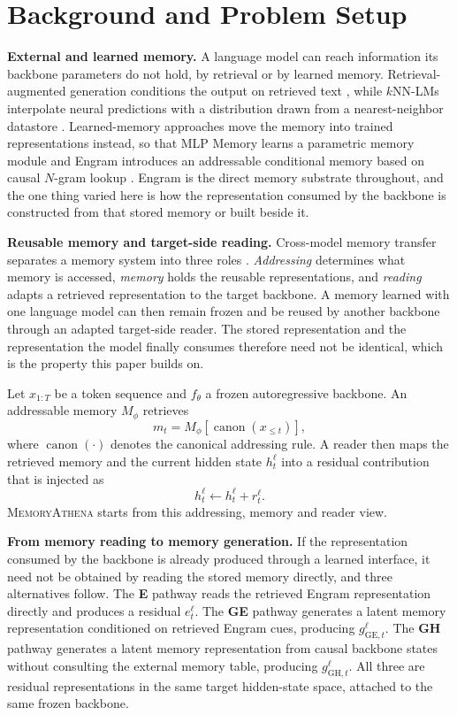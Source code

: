 \documentclass{article}
\begin{document}
\section{Background and Problem Setup}
\label{sec:background}

\textbf{External and learned memory.}
A language model can reach information its backbone parameters do not hold, by
retrieval or by learned memory. Retrieval-augmented generation conditions the
output on retrieved text \citep{lewis2020rag}, while $k$NN-LMs interpolate
neural predictions with a distribution drawn from a nearest-neighbor datastore
\citep{khandelwal2020knn}. Learned-memory approaches move the memory into trained representations
instead, so that MLP Memory learns a parametric memory module
\citep{wei2025mlp} and Engram introduces an addressable conditional memory
based on causal $N$-gram lookup \citep{cheng2026engram}. Engram is the direct memory substrate
throughout, and the one thing varied here is how the representation consumed by
the backbone is constructed from that stored memory or built beside it.

\textbf{Reusable memory and target-side reading.}
Cross-model memory transfer separates a memory system into three roles
\citep{li2026transfer}. \emph{Addressing} determines what memory is accessed,
\emph{memory} holds the reusable representations, and \emph{reading} adapts a
retrieved representation to the target backbone. A memory learned with one
language model can then remain frozen and be reused by another backbone through
an adapted target-side reader. The stored representation and the representation the model finally consumes
therefore need not be identical, which is the property this paper builds on.

Let $x_{1:T}$ be a token sequence and $f_\theta$ a frozen autoregressive
backbone. An addressable memory $M_\phi$ retrieves
\begin{equation}
    m_t = M_\phi[\operatorname{canon}(x_{\leq t})],
\end{equation}
where $\operatorname{canon}(\cdot)$ denotes the canonical addressing rule.
A reader then maps the retrieved memory and the current hidden state
$h_t^\ell$ into a residual contribution that is injected as
\begin{equation}
    h_t^\ell \leftarrow h_t^\ell + r_t^\ell .
\end{equation}
\textsc{MemoryAthena} starts from this addressing, memory and reader view.

\textbf{From memory reading to memory generation.}
If the representation consumed by the backbone is already produced through a
learned interface, it need not be obtained by reading the stored memory
directly, and three alternatives follow. The \textbf{E} pathway reads the retrieved Engram
representation directly and produces a residual $e_t^\ell$.
The \textbf{GE} pathway generates a latent memory representation conditioned on
retrieved Engram cues, producing $g_{\mathrm{GE},t}^\ell$.
The \textbf{GH} pathway generates a latent memory representation from causal
backbone states without consulting the external memory table, producing
$g_{\mathrm{GH},t}^\ell$.
All three are residual representations in the same target hidden-state space,
attached to the same frozen backbone.
\end{document}
